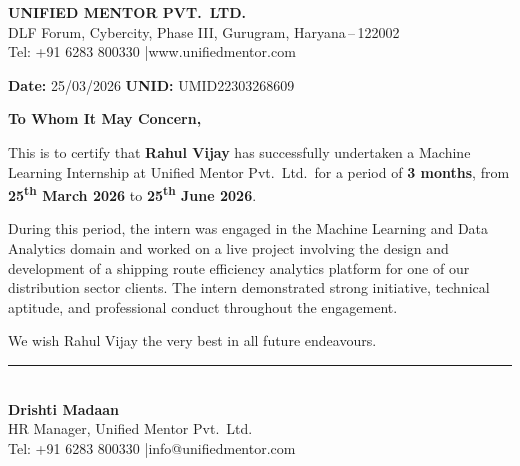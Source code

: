 \documentclass[12pt, a4paper]{report}
\begin{document}
\vspace{0.5cm}

\begin{tcolorbox}[
  colback=lightblue,
  colframe=umblue,
  boxrule=1.5pt,
  arc=4pt,
  left=14pt, right=14pt, top=14pt, bottom=14pt
]
  \begin{center}
    {\Large\bfseries\color{umblue} UNIFIED MENTOR PVT.\ LTD.}\\[6pt]
    {\normalsize\color{umblue}
      DLF Forum, Cybercity, Phase III, Gurugram, Haryana\,--\,122002}\\[2pt]
    {\normalsize\color{umblue}
      Tel: +91 6283 800330 \quad|\quad www.unifiedmentor.com}
  \end{center}

  \vspace{0.5cm}

  {
  \noindent\textbf{Date:} 25/03/2026 \hfill
  \textbf{UNID:} UMID22303268609

  \vspace{0.4cm}
  \noindent\textbf{To Whom It May Concern,}

  \vspace{0.3cm}
  This is to certify that \textbf{Rahul Vijay} has successfully undertaken a
  Machine Learning Internship at Unified Mentor Pvt.\ Ltd.\ for a period of
  \textbf{3 months}, from \textbf{25\textsuperscript{th} March 2026} to
  \textbf{25\textsuperscript{th} June 2026}.

  During this period, the intern was engaged in the Machine Learning and Data
  Analytics domain and worked on a live project involving the design and
  development of a shipping route efficiency analytics platform for one of
  our distribution sector clients. The intern demonstrated strong initiative,
  technical aptitude, and professional conduct throughout the engagement.

  We wish Rahul Vijay the very best in all future endeavours.
  }

  \vspace{0.8cm}

  \noindent\rule{5cm}{0.4pt}\\[4pt]
  \textbf{Drishti Madaan}\\
  HR Manager, Unified Mentor Pvt.\ Ltd.\\
  Tel: +91 6283 800330 \quad|\quad info@unifiedmentor.com
\end{tcolorbox}

\clearpage

\end{document}
